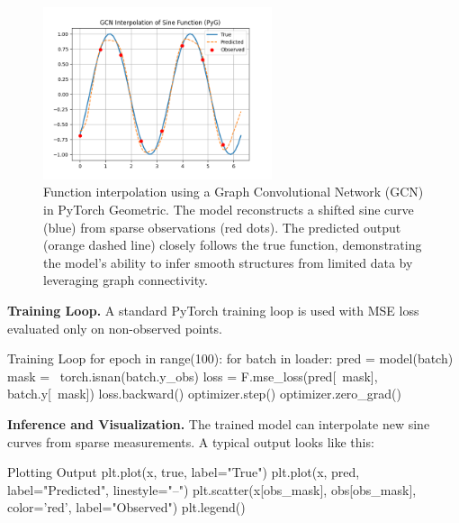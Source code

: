%
\begin{figure}[ht]
    \centering
    \includegraphics[width=0.6\textwidth]{images/geometric_demo.png}
    \caption{%
        Function interpolation using a Graph Convolutional Network (GCN) in PyTorch Geometric.
        The model reconstructs a shifted sine curve (blue) from sparse observations (red dots).
        The predicted output (orange dashed line) closely follows the true function, demonstrating the model's ability to infer smooth structures from limited data by leveraging graph connectivity.
    }
    \label{fig:pyg-sine-interpolation}
\end{figure}

%
{\bf Training Loop.} A standard PyTorch training loop is used with MSE loss evaluated only on non-observed points.

\begin{codeonly}{Training Loop}
for epoch in range(100):
    for batch in loader:
        pred = model(batch)
        mask = ~torch.isnan(batch.y_obs)
        loss = F.mse_loss(pred[~mask], batch.y[~mask])
        loss.backward()
        optimizer.step()
        optimizer.zero_grad()
\end{codeonly}

%
{\bf Inference and Visualization.} The trained model can interpolate new sine curves from sparse measurements. A typical output looks like this:

\begin{codeonly}{Plotting Output}
plt.plot(x, true, label="True")
plt.plot(x, pred, label="Predicted", linestyle="--")
plt.scatter(x[obs_mask], obs[obs_mask], color='red', label="Observed")
plt.legend()
\end{codeonly}

